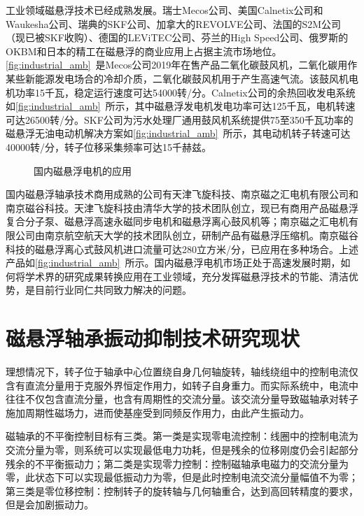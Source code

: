 \documentclass[
  lang=cn,
  degree=master,
  openany,oneside
]{nuaathesis}
\begin{document}
工业领域磁悬浮技术已经成熟发展。瑞士Mecos公司、美国Calnetix公司和Waukesha公司、瑞典的SKF公司、加拿大的REVOLVE公司、法国的S2M公司（现已被SKF收购）、德国的LEViTEC公司、芬兰的High Speed公司、俄罗斯的OKBM和日本的精工在磁悬浮的商业应用上占据主流市场地位。\autoref{fig:industrial_amb}~是Mecos公司2019年在售产品二氧化碳鼓风机，二氧化碳用作某些新能源发电场合的冷却介质，二氧化碳鼓风机用于产生高速气流。该鼓风机电机功率15千瓦，稳定运行速度可达54000转/分。Calnetix公司的余热回收发电系统如\autoref{fig:industrial_amb}~所示，其中磁悬浮发电机发电功率可达125千瓦，电机转速可达26500转/分。SKF公司为污水处理厂通用鼓风机系统提供75至350千瓦功率的磁悬浮无油电动机解决方案如\autoref{fig:industrial_amb}~所示，其电动机转子转速可达40000转/分，转子位移采集频率可达15千赫兹。

\begin{figure}[h!]
  \quad
  \quad
  \quad
  \caption[国内磁悬浮电机的应用]{国内磁悬浮电机的应用\label{fig:industrial_amb_cn}}
\end{figure}

国内磁悬浮轴承技术商用成熟的公司有天津飞旋科技、南京磁之汇电机有限公司和南京磁谷科技。天津飞旋科技由清华大学的技术团队创立，现已有商用产品磁悬浮复合分子泵、磁悬浮高速永磁同步电机和磁悬浮离心鼓风机等；南京磁之汇电机有限公司由南京航空航天大学的技术团队创立，研制产品有磁悬浮压缩机。南京磁谷科技的磁悬浮离心式鼓风机进口流量可达280立方米/分，已应用在多种场合。上述产品如\autoref{fig:industrial_amb}~所示。国内磁悬浮电机市场正处于高速发展时期，如何将学术界的研究成果转换应用在工业领域，充分发挥磁悬浮技术的节能、清洁优势，是目前行业同仁共同致力解决的问题。

\section{磁悬浮轴承振动抑制技术研究现状}
理想情况下，转子位于轴承中心位置绕自身几何轴旋转，轴线绕组中的控制电流仅含有直流分量用于克服外界恒定作用力，如转子自身重力。而实际系统中，电流中往往不仅包含直流分量，也含有周期性的交流分量。该交流分量导致磁轴承对转子施加周期性磁场力，进而使基座受到同频反作用力，由此产生振动力。

磁轴承的不平衡控制目标有三类。第一类是实现零电流控制：线圈中的控制电流为交流分量为零，则系统可以实现最低电力功耗，但是残余的位移刚度仍会引起部分残余的不平衡振动力；第二类是实现零力控制：控制磁轴承电磁力的交流分量为零，此状态下可以实现最低振动力为零，但是此时控制电流交流分量幅值不为零；第三类是零位移控制：控制转子的旋转轴与几何轴重合，达到高回转精度的要求，但是会加剧振动力。
\end{document}
